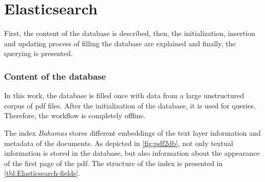 
\section{Elasticsearch}\label{subsec:impl-db}
First, the content of the database is described, then, the initialization, insertion and updating process of filling the database are explained 
and finally, the querying is presented.

\subsubsection*{Content of the database}
In this work, the database is filled once with data from a large unstructured corpus of \ac{pdf} files.
After the initialization of the database, it is used for queries. 
Therefore, the workflow is completely offline.

The index \textit{Bahamas} stores different embeddings of the text layer information and metadata of the documents.
As depicted in \autoref{fig:pdf2db}, not only textual information is stored in the database, 
but also information about the appearance of the first page of the \ac{pdf}.
The structure of the index is presented in \autoref{tbl:Elasticsearch-fields}.

